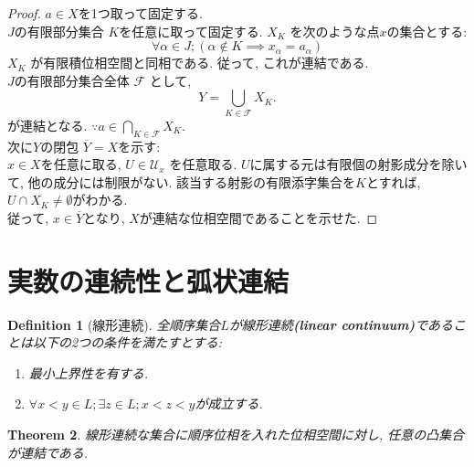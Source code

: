 \documentclass[dvipdfmx]{jbook}
\newcommand{\cl}[1]{\overline{ #1}  }
\newtheorem{theorem}{Theorem}[section]
\newtheorem{definition}[theorem]{Definition}
\theoremstyle{remark}
\theoremstyle{plain}
\begin{document}
\begin{proof}
	$a \in X$を1つ取って固定する.\\
	 $J$の有限部分集合 $K$を任意に取って固定する.  $X_{K}$ を次のような点$x$の集合とする:  
	 $$ 
	 \forall \alpha \in J;  \left( \alpha \notin K \implies x_{\alpha} = a_{\alpha} \right)
	 $$ 
	 $X_{K}$ が有限積位相空間と同相である. 従って, これが連結である.\\
	 $J$の有限部分集合全体 $\mathcal{F}$ として, 
	  \[
	 Y = \bigcup_{K \in \mathcal{F} } X_{K} 
	 .\] 
	 が連結となる. $\because a \in \bigcap_{K \in \mathcal{F}} X_{K} $.\\
	 次に$Y$の閉包 $\cl{Y} = X$を示す: \\
	 $x \in X$を任意に取る,  $U \in \mathcal{U}_x$ を任意取る. 
	  $U$に属する元は有限個の射影成分を除いて, 他の成分には制限がない. 該当する射影の有限添字集合を$K$とすれば,  $U \cap X_{K} \neq \emptyset $がわかる.\\
	  従って, $x \in \cl{Y}$となり, $X$が連結な位相空間であることを示せた.
\end{proof}

\section{実数の連続性と弧状連結}

\begin{definition}[線形連続]
	全順序集合$L$が線形連続\textbf{(linear continuum)}であることは以下の2つの条件を満たすとする:
	\begin{enumerate}
		\item 最小上界性を有する.
		\item $\forall x< y \in L ; \exists z \in L; x<z<y$が成立する.
	\end{enumerate}
\end{definition}

\begin{theorem}
	線形連続な集合に順序位相を入れた位相空間に対し, 任意の凸集合が連結である.
\end{theorem}
\end{document}
